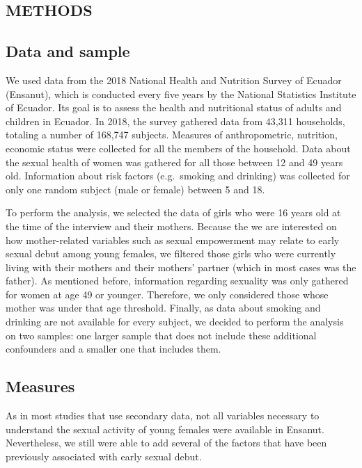 \documentclass[
]{article}
\begin{document}
\hypertarget{methods}{%
\subsection{METHODS}\label{methods}}

\hypertarget{data-and-sample}{%
\subsection{Data and sample}\label{data-and-sample}}

We used data from the 2018 National Health and Nutrition Survey of
Ecuador (Ensanut), which is conducted every five years by the National
Statistics Institute of Ecuador. Its goal is to assess the health and
nutritional status of adults and children in Ecuador. In 2018, the
survey gathered data from 43,311 households, totaling a number of
168,747 subjects. Measures of anthropometric, nutrition, economic status
were collected for all the members of the household. Data about the
sexual health of women was gathered for all those between 12 and 49
years old. Information about risk factors (e.g.~smoking and drinking)
was collected for only one random subject (male or female) between 5 and
18.

To perform the analysis, we selected the data of girls who were 16 years
old at the time of the interview and their mothers. Because the we are
interested on how mother-related variables such as sexual empowerment
may relate to early sexual debut among young females, we filtered those
girls who were currently living with their mothers and their mothers'
partner (which in most cases was the father). As mentioned before,
information regarding sexuality was only gathered for women at age 49 or
younger. Therefore, we only considered those whose mother was under that
age threshold. Finally, as data about smoking and drinking are not
available for every subject, we decided to perform the analysis on two
samples: one larger sample that does not include these additional
confounders and a smaller one that includes them.

\hypertarget{measures}{%
\subsection{Measures}\label{measures}}

As in most studies that use secondary data, not all variables necessary
to understand the sexual activity of young females were available in
Ensanut. Nevertheless, we still were able to add several of the factors
that have been previously associated with early sexual debut.
\end{document}
